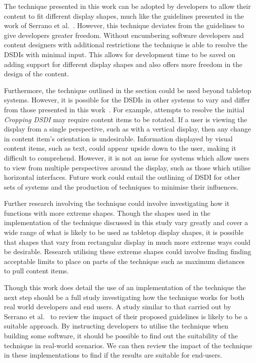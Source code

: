 \documentclass{bmcart}
\begin{document}
The technique presented in this work can be adopted by developers to allow their content to fit different display shapes, much like the guidelines presented in the work of Serrano et al.~\cite{Serrano2016,Serrano2017}.
However, this technique deviates from the guidelines to give developers greater freedom.
Without encumbering software developers and content designers with additional restrictions the technique is able to resolve the \acp{DSDI} with minimal input.
This allows for development time to be saved on adding support for different display shapes and also offers more freedom in the design of the content.

Furthermore, the technique outlined in the  section could be used beyond tabletop systems.
However, it is possible for the \acp{DSDI} in other systems to vary and differ from those presented in this work~\cite{Serrano2017}. 
For example, attempts to resolve the initial {\emph{Cropping \ac{DSDI}}} may require content items to be rotated.
If a user is viewing the display from a single perspective, such as with a vertical display, then any change in content item's orientation is undesirable.
Information displayed by visual content items, such as text, could appear upside down to the user, making it difficult to comprehend.
However, it is not an issue for systems which allow users to view from multiple perspectives around the display, such as those which utilise horizontal interfaces.
Future work could entail the outlining of \ac{DSDI} for other sets of systems and the production of techniques to minimise their influences.

Further research involving the technique could involve investigating how it functions with more extreme shapes.
Though the shapes used in the implementation of the technique discussed in this study vary greatly and cover a wide range of what is likely to be used as tabletop display shapes, it is possible that shapes that vary from rectangular display in much more extreme ways could be desirable.
Research utilising these extreme shapes could involve finding finding acceptable limits to place on parts of the technique such as maximum distances to pull content items.

Though this work does detail the use of an implementation of the technique the next step should be a full study investigating how the technique works for both real world developers and end users.
A study similar to that carried out by Serrano et al.~\cite{Serrano2017} to review the impact of their proposed guidelines is likely to be a suitable approach.
By instructing developers to utilise the technique when building some software, it should be possible to find out the suitability of the technique in real-world scenarios.
We can then review the impact of the technique in these implementations to find if the results are suitable for end-users.
\end{document}
